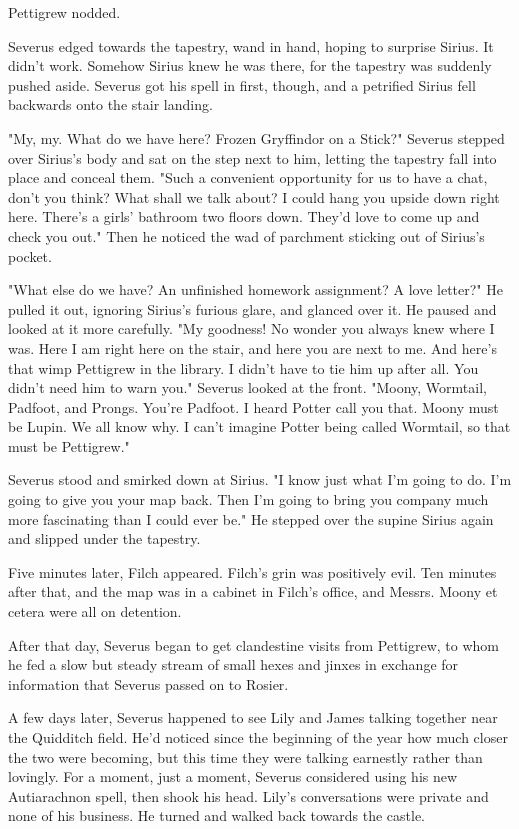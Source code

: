 Pettigrew nodded.

Severus edged towards the tapestry, wand in hand, hoping to surprise Sirius. It didn't work. Somehow Sirius knew he was there, for the tapestry was suddenly pushed aside. Severus got his spell in first, though, and a petrified Sirius fell backwards onto the stair landing.

"My, my. What do we have here? Frozen Gryffindor on a Stick?" Severus stepped over Sirius's body and sat on the step next to him, letting the tapestry fall into place and conceal them. "Such a convenient opportunity for us to have a chat, don't you think? What shall we talk about? I could hang you upside down right here. There's a girls' bathroom two floors down. They'd love to come up and check you out." Then he noticed the wad of parchment sticking out of Sirius's pocket.

"What else do we have? An unfinished homework assignment? A love letter?" He pulled it out, ignoring Sirius's furious glare, and glanced over it. He paused and looked at it more carefully. "My goodness! No wonder you always knew where I was. Here I am right here on the stair, and here you are next to me. And here's that wimp Pettigrew in the library. I didn't have to tie him up after all. You didn't need him to warn you." Severus looked at the front. "Moony, Wormtail, Padfoot, and Prongs. You're Padfoot. I heard Potter call you that. Moony must be Lupin. We all know why. I can't imagine Potter being called Wormtail, so that must be Pettigrew."

Severus stood and smirked down at Sirius. "I know just what I'm going to do. I'm going to give you your map back. Then I'm going to bring you company much more fascinating than I could ever be." He stepped over the supine Sirius again and slipped under the tapestry.

Five minutes later, Filch appeared. Filch's grin was positively evil. Ten minutes after that, and the map was in a cabinet in Filch's office, and Messrs. Moony et cetera were all on detention.

After that day, Severus began to get clandestine visits from Pettigrew, to whom he fed a slow but steady stream of small hexes and jinxes in exchange for information that Severus passed on to Rosier.

A few days later, Severus happened to see Lily and James talking together near the Quidditch field. He'd noticed since the beginning of the year how much closer the two were becoming, but this time they were talking earnestly rather than lovingly. For a moment, just a moment, Severus considered using his new Autiarachnon spell, then shook his head. Lily's conversations were private and none of his business. He turned and walked back towards the castle.

